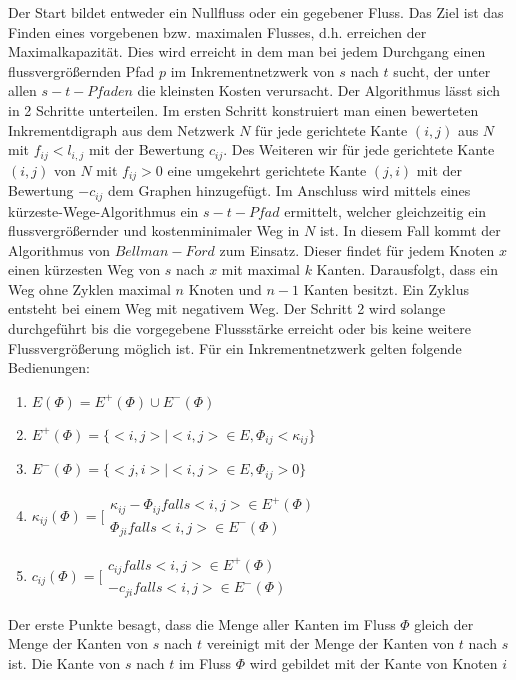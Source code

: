 Der Start bildet entweder ein Nullfluss oder ein gegebener Fluss. Das Ziel 
ist das Finden eines vorgebenen bzw. maximalen Flusses, d.h. erreichen der 
Maximalkapazität. Dies wird erreicht in dem man bei jedem Durchgang einen 
flussvergrößernden Pfad $p$ im Inkrementnetzwerk von $s$ nach $t$ sucht, der
unter allen $s-t-Pfaden$ die kleinsten Kosten verursacht. Der Algorithmus 
lässt sich in 2 Schritte unterteilen. Im ersten Schritt konstruiert man einen 
bewerteten Inkrementdigraph aus dem Netzwerk $N$ für jede gerichtete Kante $(i,j)$ aus
$N$ mit $f_{ij} < l_{i,j}$ mit der Bewertung $c_{ij}$. Des Weiteren wir für jede 
gerichtete Kante $(i,j)$ von $N$ mit $f_{ij} > 0$ eine umgekehrt gerichtete Kante 
$(j,i)$ mit der Bewertung $-c_{ij}$ dem Graphen hinzugefügt. Im Anschluss 
wird mittels eines kürzeste-Wege-Algorithmus ein $s-t-Pfad$ ermittelt, 
welcher gleichzeitig ein flussvergrößernder und kostenminimaler Weg in $N$ 
ist. In diesem Fall kommt der Algorithmus von $Bellman-Ford$ zum Einsatz. Dieser 
findet für jedem Knoten $x$ einen kürzesten Weg von $s$ nach $x$ mit maximal $k$ 
Kanten. Darausfolgt, dass ein Weg ohne Zyklen maximal $n$ Knoten und $n-1$ Kanten 
besitzt. Ein Zyklus entsteht bei einem Weg mit negativem Weg. Der Schritt 2 wird 
solange durchgeführt bis die vorgegebene Flussstärke erreicht oder bis keine weitere 
Flussvergrößerung möglich ist. Für ein Inkrementnetzwerk gelten folgende Bedienungen:
\begin{enumerate}
 \item $E(\Phi)=E^+(\Phi)\cup E^-(\Phi)$
 \item $E^+(\Phi)=\{<i,j>|<i,j> \in E,\Phi_{ij} < \kappa_{ij}\}$
 \item $E^-(\Phi)=\{<j,i>|<i,j> \in E,\Phi_{ij} > 0\}$
 \item $\kappa_{ij}(\Phi)=\biggl[\begin{array}{ll}\kappa_{ij}-\Phi_{ij} 
 falls
 <i,j> \in E^+(\Phi) \\ \Phi_{ji} falls <i,j> \in E^-(\Phi) \end{array}$
 \item $c_{ij}(\Phi)=\biggl[\begin{array}{ll}c_{ij}falls<i,j> \in E^+(\Phi)
  \\ -c_{ji}falls<i,j> \in E^-(\Phi)\end{array}$
\end{enumerate}
Der erste Punkte besagt, dass die Menge aller Kanten im Fluss $\Phi$ gleich der Menge
der Kanten von $s$ nach $t$ vereinigt mit der Menge der Kanten von $t$ nach $s$ ist.
Die Kante von $s$ nach $t$ im Fluss $\Phi$ wird gebildet mit der Kante von Knoten $i$
